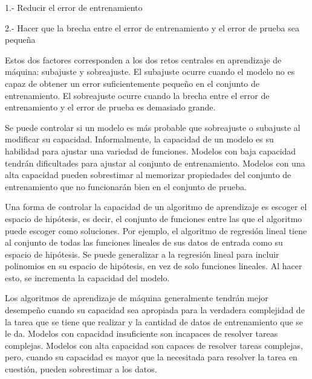 1.- Reducir el error de entrenamiento

2.- Hacer que la brecha entre el error de entrenamiento y el error de prueba sea pequeña

\vspace{1em}

Estos dos factores corresponden a los dos retos centrales en aprendizaje de máquina: subajuste y sobreajuste. El subajuste ocurre cuando el modelo no es capaz de obtener un error suficientemente pequeño en el conjunto de entrenamiento. El sobreajuste ocurre cuando la brecha entre el error de entrenamiento y el error de prueba es demasiado grande.

\vspace{1em}

Se puede controlar si un modelo es más probable que sobreajuste o subajuste al modificar su capacidad. Informalmente, la capacidad de un modelo es su habilidad para ajustar una variedad de funciones. Modelos con baja capacidad tendrán dificultades para ajustar al conjunto de entrenamiento. Modelos con una alta capacidad pueden sobrestimar al memorizar propiedades del conjunto de entrenamiento que no funcionarán bien en el conjunto de prueba.
\cite{goodfellow-et-al-2016}

\vspace{1em}

Una forma de controlar la capacidad de un algoritmo de aprendizaje es escoger el espacio de hipótesis, es decir, el conjunto de funciones entre las que el algoritmo puede escoger como soluciones. Por ejemplo, el algoritmo de regresión lineal tiene al conjunto de todas las funciones lineales de sus datos de entrada como su espacio de hipótesis. Se puede generalizar a la regresión lineal para incluir polinomios en su espacio de hipótesis, en vez de solo funciones lineales. Al hacer esto, se incrementa la capacidad del modelo.

\vspace{1em}

Los algoritmos de aprendizaje de máquina generalmente tendrán mejor desempeño cuando su capacidad sea apropiada para la verdadera complejidad de la tarea que se tiene que realizar y la cantidad de datos de entrenamiento que se le da. Modelos con capacidad insuficiente son incapaces de resolver tareas complejas. Modelos con alta capacidad son capaces de resolver tareas complejas, pero, cuando su capacidad es mayor que la necesitada para resolver la tarea en cuestión, pueden sobrestimar a los datos.

